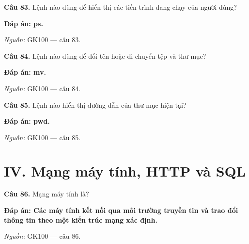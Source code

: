 \documentclass[11pt,a4paper]{article}
\begin{document}
\textbf{Câu 83.} Lệnh nào dùng để hiển thị các tiến trình đang chạy của người dùng?\par
{\color{answer}\textbf{Đáp án: ps.}}\par
{\footnotesize\color{sourcegray}\textit{Nguồn:} GK100 — câu 83.\par}
\vspace{3pt}\par\noindent{\color{black!18}\rule{\linewidth}{0.3pt}}\par\medskip

\textbf{Câu 84.} Lệnh nào dùng để đổi tên hoặc di chuyển tệp và thư mục?\par
{\color{answer}\textbf{Đáp án: mv.}}\par
{\footnotesize\color{sourcegray}\textit{Nguồn:} GK100 — câu 84.\par}
\vspace{3pt}\par\noindent{\color{black!18}\rule{\linewidth}{0.3pt}}\par\medskip

\textbf{Câu 85.} Lệnh nào hiển thị đường dẫn của thư mục hiện tại?\par
{\color{answer}\textbf{Đáp án: pwd.}}\par
{\footnotesize\color{sourcegray}\textit{Nguồn:} GK100 — câu 85.\par}
\vspace{3pt}\par\noindent{\color{black!18}\rule{\linewidth}{0.3pt}}\par\medskip

\section*{IV. Mạng máy tính, HTTP và SQL}

\textbf{Câu 86.} Mạng máy tính là?\par
{\color{answer}\textbf{Đáp án: Các máy tính kết nối qua môi trường truyền tin và trao đổi thông tin theo một kiến trúc mạng xác định.}}\par
{\footnotesize\color{sourcegray}\textit{Nguồn:} GK100 — câu 86.\par}
\vspace{3pt}\par\noindent{\color{black!18}\rule{\linewidth}{0.3pt}}\par\medskip
\end{document}
